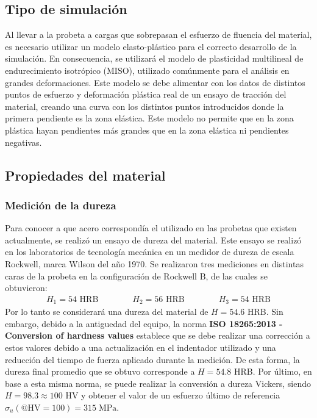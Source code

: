 \subsection{Tipo de simulación}
Al llevar a la probeta a cargas que sobrepasan el esfuerzo de fluencia del material, es necesario utilizar un modelo elasto-plástico para el correcto desarrollo de la simulación. En consecuencia, se utilizará el modelo de plasticidad multilineal de endurecimiento isotrópico (MISO), utilizado comúnmente para el análisis en grandes deformaciones. Este modelo se debe alimentar con los datos de distintos puntos de esfuerzo y deformación plástica real de un ensayo de tracción del material, creando una curva con los distintos puntos introducidos donde la primera pendiente es la zona elástica. Este modelo no permite que en la zona plástica hayan pendientes más grandes que en la zona elástica ni pendientes negativas. 

\subsection{Propiedades del material}
\subsubsection{Medición de la dureza}
Para conocer a que acero correspondía el utilizado en las probetas que existen actualmente, se realizó un ensayo de dureza del material. Este ensayo se realizó en los laboratorios de tecnología mecánica en un medidor de dureza de escala Rockwell, marca Wilson del año 1970. Se realizaron tres mediciones en distintas caras de la probeta en la configuración de Rockwell B, de las cuales se obtuvieron:
\begin{gather*}
	H_1 = 54 \text{ HRB} \qquad \qquad H_2 = 56 \text{ HRB} \qquad \qquad H_3 = 54 \text{ HRB}
\end{gather*}
Por lo tanto se considerará una dureza del material de $H = 54.6$ HRB. Sin embargo, debido a la antiguedad del equipo, la norma \textbf{ISO 18265:2013 - Conversion of hardness values} \cite{ISO18265} establece que se debe realizar una corrección a estos valores debido a una actualización en el indentador utilizado y una reducción del tiempo de fuerza aplicado durante la medición. De esta forma, la dureza final promedio que se obtuvo corresponde a $H = 54.8$ HRB. Por último, en base a esta misma norma, se puede realizar la conversión a dureza Vickers, siendo $H = 98.3 \approx 100$ HV y obtener el valor de un esfuerzo último de referencia $\sigma_u(\texttt{@}\text{HV}=100) = 315 \; \text{MPa}$.

